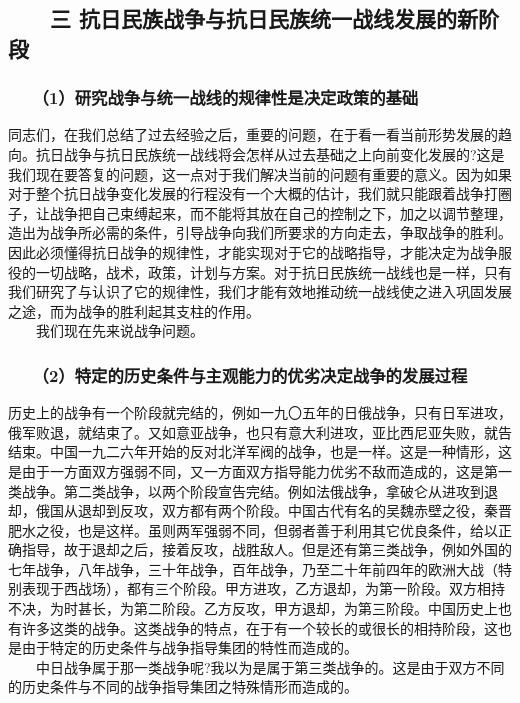 \documentclass[cn,11pt,chinese]{elegantbook}
\def\myformat#1{\hfil\hfil #1}
\begin{document}
\subsection*{\myformat{　　三 抗日民族战争与抗日民族统一战线发展的新阶段}}
\subsubsection*{\myformat{　　（1）研究战争与统一战线的规律性是决定政策的基础}}
同志们，在我们总结了过去经验之后，重要的问题，在于看一看当前形势发展的趋向。抗日战争与抗日民族统一战线将会怎样从过去基础之上向前变化发展的?这是我们现在要答复的问题，这一点对于我们解决当前的问题有重要的意义。因为如果对于整个抗日战争变化发展的行程没有一个大概的估计，我们就只能跟着战争打圈子，让战争把自己束缚起来，而不能将其放在自己的控制之下，加之以调节整理，造出为战争所必需的条件，引导战争向我们所要求的方向走去，争取战争的胜利。因此必须懂得抗日战争的规律性，才能实现对于它的战略指导，才能决定为战争服役的一切战略，战术，政策，计划与方案。对于抗日民族统一战线也是一样，只有我们研究了与认识了它的规律性，我们才能有效地推动统一战线使之进入巩固发展之途，而为战争的胜利起其支柱的作用。\\
　　我们现在先来说战争问题。\\
\subsubsection*{\myformat{　　（2）特定的历史条件与主观能力的优劣决定战争的发展过程}}
历史上的战争有一个阶段就完结的，例如一九〇五年的日俄战争，只有日军进攻，俄军败退，就结束了。又如意亚战争，也只有意大利进攻，亚比西尼亚失败，就告结束。中国一九二六年开始的反对北洋军阀的战争，也是一样。这是一种情形，这是由于一方面双方强弱不同，又一方面双方指导能力优劣不敌而造成的，这是第一类战争。第二类战争，以两个阶段宣告完结。例如法俄战争，拿破仑从进攻到退却，俄国从退却到反攻，双方都有两个阶段。中国古代有名的吴魏赤壁之役，秦晋肥水之役，也是这样。虽则两军强弱不同，但弱者善于利用其它优良条件，给以正确指导，故于退却之后，接着反攻，战胜敌人。但是还有第三类战争，例如外国的七年战争，八年战争，三十年战争，百年战争，乃至二十年前四年的欧洲大战（特别表现于西战场），都有三个阶段。甲方进攻，乙方退却，为第一阶段。双方相持不决，为时甚长，为第二阶段。乙方反攻，甲方退却，为第三阶段。中国历史上也有许多这类的战争。这类战争的特点，在于有一个较长的或很长的相持阶段，这也是由于特定的历史条件与战争指导集团的特性而造成的。\\
　　中日战争属于那一类战争呢?我以为是属于第三类战争的。这是由于双方不同的历史条件与不同的战争指导集团之特殊情形而造成的。\\
\end{document}
